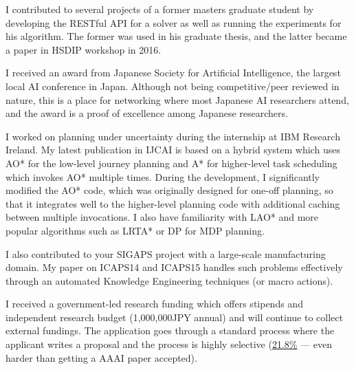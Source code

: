 \documentclass[12pt]{letter}
\begin{document}
I contributed to several projects of a former masters graduate student
by developing the RESTful API for a solver as well as running the
experiments for his algorithm. The former was used in his graduate thesis,
and the latter became a paper in HSDIP workshop in 2016.

I received an award from Japanese Society for Artificial Intelligence,
the largest local AI conference in Japan.
Although not being competitive/peer reviewed in nature,
this is a place for networking where most Japanese AI researchers attend,
and the award is a proof of excellence among Japanese researchers.

I worked on planning under uncertainty during the internship at IBM Research Ireland.
My latest publication in IJCAI is based on a hybrid system which uses
AO* for the low-level journey planning and A* for higher-level task scheduling
which invokes AO* multiple times. 
During the development, I significantly modified the AO* code, which was originally designed for one-off planning,
so that it integrates well to the higher-level planning code with additional caching between multiple invocations.
I also have familiarity with LAO* and more popular algorithms such as LRTA* or DP for MDP planning.

I also contributed to your SIGAPS project with a large-scale
manufacturing domain. My paper on ICAPS14 and ICAPS15 handles such
problems effectively through an automated Knowledge Engineering
techniques (or macro actions).

I received a government-led research funding which offers
stipends and independent research budget (1,000,000JPY annual) and will continue to collect external fundings.
The application goes through a standard process where the applicant writes 
a proposal and the process is highly selective (\href{https://www.jsps.go.jp/j-pd/pd_saiyo.html}{21.8\%}
 --- even harder than getting a AAAI paper accepted).


\end{document}
